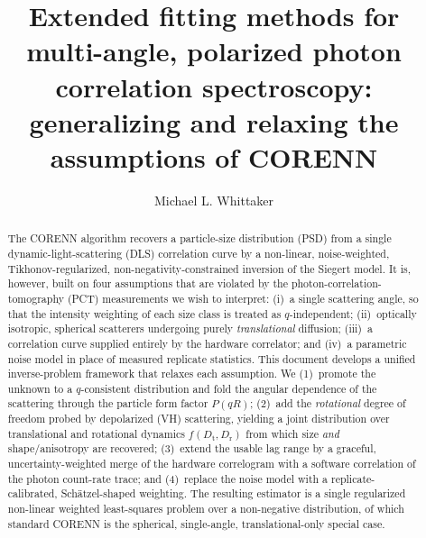 \documentclass[11pt]{article}
\title{Extended fitting methods for multi-angle, polarized photon correlation
spectroscopy:\\ generalizing and relaxing the assumptions of CORENN}
\author{Michael L. Whittaker}
\date{}
\newcommand{\Dt}{D_{\mathrm t}}
\newcommand{\Dr}{D_{\mathrm r}}
\begin{document}
\maketitle

\begin{abstract}
The CORENN algorithm recovers a particle-size distribution (PSD) from a single
dynamic-light-scattering (DLS) correlation curve by a non-linear,
noise-weighted, Tikhonov-regularized, non-negativity-constrained inversion of
the Siegert model. It is, however, built on four assumptions that are violated
by the photon-correlation-tomography (PCT) measurements we wish to interpret:
(i)~a single scattering angle, so that the intensity weighting of each size
class is treated as $q$-independent; (ii)~optically isotropic, spherical
scatterers undergoing purely \emph{translational} diffusion; (iii)~a correlation
curve supplied entirely by the hardware correlator; and (iv)~a parametric noise
model in place of measured replicate statistics. This document develops a
unified inverse-problem framework that relaxes each assumption. We (1)~promote
the unknown to a $q$-consistent distribution and fold the angular dependence of
the scattering through the particle form factor $P(qR)$; (2)~add the
\emph{rotational} degree of freedom probed by depolarized (VH) scattering,
yielding a joint distribution over translational and rotational dynamics
$f(\Dt,\Dr)$ from which size \emph{and} shape/anisotropy are recovered;
(3)~extend the usable lag range by a graceful, uncertainty-weighted merge of the
hardware correlogram with a software correlation of the photon count-rate trace;
and (4)~replace the noise model with a replicate-calibrated, Schätzel-shaped
weighting. The resulting estimator is a single regularized non-linear weighted
least-squares problem over a non-negative distribution, of which standard CORENN
is the spherical, single-angle, translational-only special case.
\end{abstract}
\end{document}

